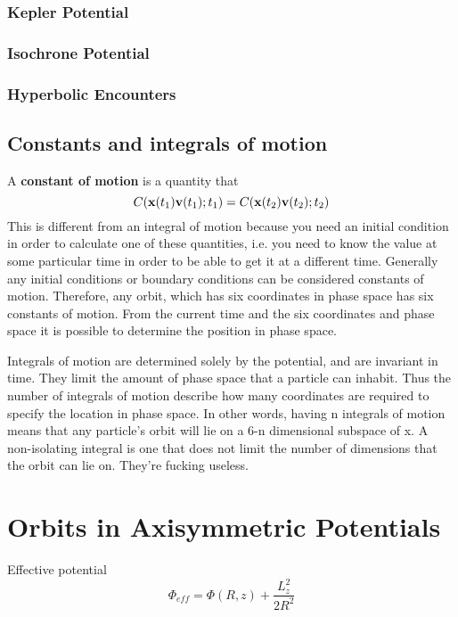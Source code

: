 \subsubsection{Kepler Potential}
\subsubsection{Isochrone Potential}
\subsubsection{Hyperbolic Encounters}



\subsection{Constants and integrals of motion}
A \textbf{constant of motion} is a quantity that 
\begin{equation}
C(\mathbf{x}(t_1) \mathbf{v}(t_1); t_1) = C(\mathbf{x}(t_2) \mathbf{v}(t_2); t_2)
\end{equation}
This is different from an integral of motion because you need an
initial condition in order to calculate one of these quantities,
i.e. you need to know the value at some particular time in order to be
able to get it at a different time. Generally any initial conditions
or boundary conditions can be considered constants of
motion. Therefore, any orbit, which has six coordinates in phase space
has six constants of motion. From the current time and the six coordinates and
phase space it is possible to determine the position in phase space. 

Integrals of motion are determined solely by the potential, and are
invariant in time. They limit the amount of phase space that a
particle can inhabit. Thus the number of integrals of motion describe
how many coordinates are required to specify the location in phase
space. In other words, having n integrals of motion means that any
particle's orbit will lie on a 6-n dimensional subspace of x. A
non-isolating integral is one that does not limit the number of
dimensions that the orbit can lie on. They're fucking useless. 

\section{Orbits in Axisymmetric Potentials}
Effective potential
\begin{equation}
\Phi_{eff} = \Phi(R, z) + \frac{L_z^2}{2R^2}
\end{equation}




